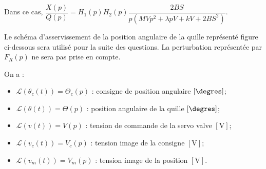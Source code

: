 \ifprof
\begin{corrige}
Dans ce cas, $\dfrac{X(p)}{Q(p)}=H_1(p)H_2(p)\dfrac{2BS}{p\left(MVp^2  +\lambda pV  + kV+ 2BS^2\right) }$.
\end{corrige}
\else
\fi

\ifprof
\else
Le schéma d’asservissement de la position angulaire de la quille représenté figure ci-dessous sera utilisé
pour la suite des questions. La perturbation représentée par $F_R(p)$ ne sera pas prise en compte.

\footnotesize
\begin{center}
\end{center}

\normalsize


On a :
\begin{itemize}
\item $\mathcal{L}\left(\theta_c(t)\right)=\Theta_c(p)$ : consigne de position angulaire $\left[\degres\right]$;
\item $\mathcal{L}\left(\theta(t)\right)=\Theta(p)$ : position angulaire de la quille $\left[\degres\right]$;
\item $\mathcal{L}\left(v(t)\right)=V(p)$ : tension de commande de la servo valve $\left[\text{V}\right]$;
\item $\mathcal{L}\left(v_c(t)\right)=V_c(p)$ : tension image de la consigne $\left[\text{V}\right]$;
\item $\mathcal{L}\left(v_m(t)\right)=V_m(p)$ : tension image de la position $\left[\text{V}\right]$.
\end{itemize}

